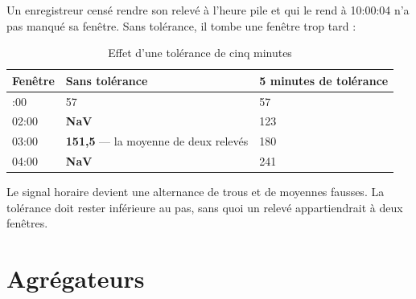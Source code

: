 \documentclass[11pt,a4paper]{report}
\begin{document}
Un enregistreur censé rendre son relevé à l'heure pile et qui le rend à
10:00:04 n'a pas manqué sa fenêtre. Sans tolérance, il tombe une fenêtre
trop tard :

\begin{longtable}[]{@{}lll@{}}
\caption{Effet d'une tolérance de cinq minutes}\label{tab:tolerance}\\
\toprule\noalign{}
Fenêtre & Sans tolérance & 5 minutes de tolérance \\
\midrule\noalign{}
\endhead
\bottomrule\noalign{}
\endlastfoot
01:00 & 57 & 57 \\
02:00 & \textbf{NaV} & 123 \\
03:00 & \textbf{151,5} --- la moyenne de deux relevés & 180 \\
04:00 & \textbf{NaV} & 241 \\
\end{longtable}

Le signal horaire devient une alternance de trous et de moyennes
fausses. La tolérance doit rester inférieure au pas, sans quoi un relevé
appartiendrait à deux fenêtres.

\section{Agrégateurs}\label{sec:agregateurs}
\end{document}
